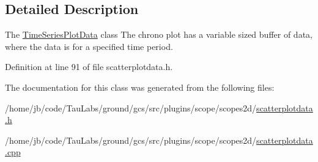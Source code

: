 \subsection{\-Detailed \-Description}
\-The \hyperlink{class_time_series_plot_data}{\-Time\-Series\-Plot\-Data} class \-The chrono plot has a variable sized buffer of data, where the data is for a specified time period. 

\-Definition at line 91 of file scatterplotdata.\-h.



\-The documentation for this class was generated from the following files\-:\begin{DoxyCompactItemize}
\item 
/home/jb/code/\-Tau\-Labs/ground/gcs/src/plugins/scope/scopes2d/\hyperlink{scatterplotdata_8h}{scatterplotdata.\-h}\item 
/home/jb/code/\-Tau\-Labs/ground/gcs/src/plugins/scope/scopes2d/\hyperlink{scatterplotdata_8cpp}{scatterplotdata.\-cpp}\end{DoxyCompactItemize}
